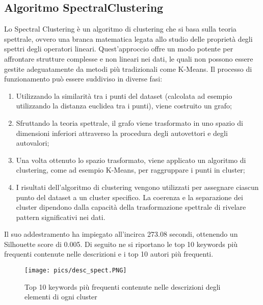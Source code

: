 \documentclass[12pt,oneside]{article}
\begin{document}
    \begin{enumerate}
    \subsection{Algoritmo SpectralClustering}
    \begin{justify}
    Lo Spectral Clustering è un algoritmo di clustering che si basa sulla teoria spettrale, ovvero una branca matematica legata allo studio delle proprietà degli spettri degli operatori lineari. Quest'approccio offre un modo potente per affrontare strutture complesse e non lineari nei dati, le quali non possono essere gestite adeguatamente da metodi più tradizionali come K-Means. 
    Il processo di funzionamento può essere suddiviso in diverse fasi:
    \begin{enumerate}[label=\arabic*)]
        \item Utilizzando la similarità tra i punti del dataset (calcolata ad esempio utilizzando la distanza euclidea tra i punti), viene costruito un grafo;
        \item Sfruttando la teoria spettrale, il grafo viene trasformato in uno spazio di dimensioni inferiori attraverso la procedura degli autovettori e degli autovalori;
        \item Una volta ottenuto lo spazio trasformato, viene applicato un algoritmo di clustering, come ad esempio K-Means, per raggruppare i punti in cluster;
        \item I risultati dell'algoritmo di clustering vengono utilizzati per assegnare ciascun punto del dataset a un cluster specifico. La coerenza e la separazione dei cluster dipendono dalla capacità della trasformazione spettrale di rivelare pattern significativi nei dati.
    \end{enumerate}
    Il suo addestramento ha impiegato all’incirca 273.08 secondi, ottenendo un Silhouette score di 0.005. Di seguito ne si riportano le top 10 keywords più frequenti contenute nelle descrizioni e i top 10 autori più frequenti.
    \end{justify}

    \hfill

    \begin{figure}[H]
    \texttt{[image: pics/desc\_spect.PNG]}
    \captionsetup{width=0.90\textwidth, justification=centering}
    \caption{Top 10 keywords più frequenti contenute nelle descrizioni degli elementi di ogni cluster}
    \end{figure}



\end{enumerate}
\end{document}
